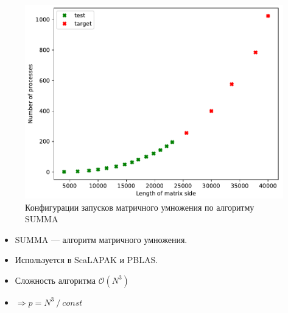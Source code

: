 \documentclass[unicode, t, 11pt]{beamer}%
\newlength{\mylen}
\begin{document}
			\begin{frame}
				\footnotesize
				\frametitle{\insertsection}
		 		\framesubtitle{\insertsubsection}
		 		\begin{columns}[T]
		 			\setlength{\mylen}{0.5\textwidth}
		 			\begin{column}{\mylen}
		 				\begin{figure}
							\captionsetup{font=tiny, labelfont=tiny}
							\includegraphics[width=.83\textwidth]{./images/conf_SUMMA_NEW}%
							\caption{Конфигурации запусков матричного умножения по алгоритму SUMMA}
						\end{figure}
						\begin{itemize}[label = \(\bullet\)]
					 		\item SUMMA — алгоритм матричного умножения.
					 		\item Используется в ScaLAPAK и PBLAS.
					 		\item Сложность алгоритма \(\mathcal{O}(N^3)\)
			 				\item \(\Rightarrow p = N^3\:/\:const\)
					 	\end{itemize}

\end{column}
\end{columns}
\end{frame}
\end{document}

